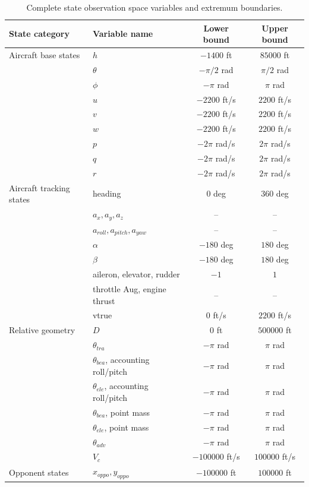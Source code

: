 \documentclass[pdflatex,sn-mathphys-num]{sn-jnl}%
\theoremstyle{thmstyleone}%
\theoremstyle{thmstyletwo}%
\theoremstyle{thmstylethree}%
\begin{document}
\begin{appendices}
\begin{table}[h]
\caption{Complete state observation space variables and extremum boundaries.}\label{tab:full_state_space}%
\small
\begin{tabular*}{\textwidth}{@{\extracolsep\fill}p{}p{}cc}
\toprule
State category & Variable name & Lower bound & Upper bound \\
\midrule
Aircraft base states
& $h$ & $-1400$ ft & $85000$ ft \\
& $\theta$ & $-\pi/2$ rad & $\pi/2$ rad \\
& $\phi$ & $-\pi$ rad & $\pi$ rad \\
& $u$ & $-2200$ ft/s & $2200$ ft/s \\
& $v$ & $-2200$ ft/s & $2200$ ft/s \\
& $w$ & $-2200$ ft/s & $2200$ ft/s \\
& $p$ & $-2\pi$ rad/s & $2\pi$ rad/s \\
& $q$ & $-2\pi$ rad/s & $2\pi$ rad/s \\
& $r$ & $-2\pi$ rad/s & $2\pi$ rad/s \\
\midrule
Aircraft tracking states
& heading & $0$ deg & $360$ deg \\
& $a_x,a_y,a_z$ & -- & -- \\
& $a_{roll},a_{pitch},a_{yaw}$ & -- & -- \\
& $\alpha$ & $-180$ deg & $180$ deg \\
& $\beta$ & $-180$ deg & $180$ deg \\
& aileron, elevator, rudder & $-1$ & $1$ \\
& throttle Aug, engine thrust & -- & -- \\
& vtrue & $0$ ft/s & $2200$ ft/s \\
\midrule
Relative geometry
& $D$ & $0$ ft & $500000$ ft \\
& $\theta_{tra}$ & $-\pi$ rad & $\pi$ rad \\
& $\theta_{bea}$, accounting roll/pitch & $-\pi$ rad & $\pi$ rad \\
& $\theta_{ele}$, accounting roll/pitch & $-\pi$ rad & $\pi$ rad \\
& $\theta_{bea}$, point mass & $-\pi$ rad & $\pi$ rad \\
& $\theta_{ele}$, point mass & $-\pi$ rad & $\pi$ rad \\
& $\theta_{adv}$ & $-\pi$ rad & $\pi$ rad \\
& $V_c$ & $-100000$ ft/s & $100000$ ft/s \\
\midrule
Opponent states
& $x_{oppo},y_{oppo}$ & $-100000$ ft & $100000$ ft \\

\end{tabular*}
\end{table}
\end{appendices}
\end{document}

